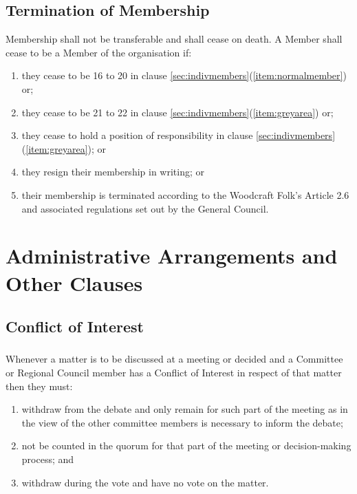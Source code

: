 \documentclass[a4paper, 12pt]{report}
\begin{document}
\subsection{Termination of Membership}
Membership shall not be transferable and shall cease on death. A Member shall cease to be
a Member of the organisation if:
\begin{enumerate}[\hspace{0.5cm}(a)]
\item they cease to be 16 to 20 in clause \ref{sec:indivmembers}(\ref{item:normalmember}) or;
\item they cease to be 21 to 22 in clause \ref{sec:indivmembers}(\ref{item:greyarea}) or;
\item they cease to hold a position of responsibility in clause \ref{sec:indivmembers}(\ref{item:greyarea}); or
\item they resign their membership in writing; or
\item their membership is terminated according to the Woodcraft Folk's Article 2.6 and associated regulations set out by the General Council.
\end{enumerate}

\section{Administrative Arrangements and Other Clauses}
\label{sec:admin}
\subsection{Conflict of Interest}
\subsubsection{}
Whenever a matter is to be discussed at a meeting or decided and a Committee or Regional Council member has a Conflict of Interest in respect of that matter then they must:
\begin{enumerate}[\hspace{0.5cm}(a)]
\item withdraw from the debate and only remain for such part of the meeting as in the view of the other committee members is necessary to inform the debate;
\item not be counted in the quorum for that part of the meeting or decision-making process; and
\item withdraw during the vote and have no vote on the matter.
\end{enumerate}
\end{document}
